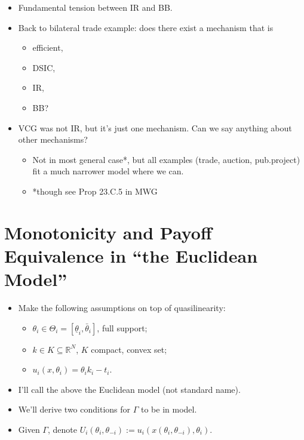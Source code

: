 \documentclass[english,handout]{beamer}		%
\def\lyxframeend{} %
\begin{document}
\begin{itemize}
	\item Fundamental tension between IR and BB.
	\item Back to bilateral trade example: does there exist a mechanism that is
	\begin{itemize}
		\item efficient,
		\item DSIC,
		\item IR,
		\item BB?
	\end{itemize}
	\pause
	\item VCG was not IR, but it's just one mechanism. Can we say anything about other mechanisms?
	\begin{itemize}
		\item Not in most general case*, but all examples (trade, auction, pub.project) fit a much narrower model where we can.
		\item *though see Prop 23.C.5 in MWG
	\end{itemize}
\end{itemize}
\lyxframeend





\section{Monotonicity and Payoff Equivalence in ``the Euclidean Model''}

\begin{itemize}
	\item Make the following assumptions on top of quasilinearity:
	\begin{itemize}
		\item $\theta_i \in \Theta_{i} = [\underline{\theta}_i, \bar{\theta}_i]$, full support;
		\item $k \in K \subseteq \mathbb{R}^N$, $K$ compact, convex set;
		\item $u_i(x,\theta_i) = \theta_i k_i - t_i$.
	\end{itemize}
	\item I'll call the above \alert{the Euclidean model} (not standard name).
	\item We'll derive two  conditions for $\Gamma$ to be  in  model.
	\item Given $\Gamma$, denote $U_i(\theta_i, \theta_{-i}) := u_i\left(x(\theta_i, \theta_{-i}), \theta_i \right)$.
\end{itemize}
\lyxframeend
\end{document}
